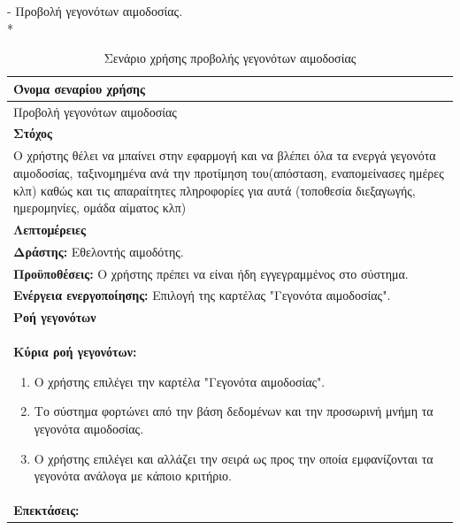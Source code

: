 - Προβολή  γεγονότων αιμοδοσίας.
\\*
\begin{table}[H]	
	\begin{center}
	    \begin{tabular}{|p{\dimexpr \linewidth-2\tabcolsep}|}
	    \hline
	    \rowcolor{grayy}
	    \textbf{Όνομα σεναρίου χρήσης}
	    \\ \hline    
	    Προβολή γεγονότων αιμοδοσίας
	     \\ \hline
	    \rowcolor{grayy}
	    \textbf{\textbf{Στόχος}}
	    \\ \hline
	    	Ο χρήστης θέλει να μπαίνει στην εφαρμογή και να βλέπει όλα τα ενεργά γεγονότα αιμοδοσίας, ταξινομημένα ανά την προτίμηση του(απόσταση, εναπομείνασες ημέρες κλπ) καθώς και τις απαραίτητες πληροφορίες για αυτά (τοποθεσία διεξαγωγής, ημερομηνίες, ομάδα αίματος κλπ)
	    \\ \hline
	    \rowcolor{grayy}
	    \textbf{Λεπτομέρειες}
	    \\ \hline
		\textbf{Δράστης:} Εθελοντής αιμοδότης.
		\\*
		\textbf{Προϋποθέσεις:} Ο χρήστης πρέπει να είναι ήδη εγγεγραμμένος στο σύστημα.
		\\*
		\textbf{Ενέργεια ενεργοποίησης:} Επιλογή της καρτέλας "Γεγονότα αιμοδοσίας".
	    \\ \hline
		\rowcolor{grayy}    
	    \textbf{Ροή γεγονότων}
	    \\ \hline
		\textbf{Κύρια ροή γεγονότων:}
		\begin{enumerate}
			\item	Ο χρήστης επιλέγει την καρτέλα "Γεγονότα αιμοδοσίας".
			\item Το σύστημα φορτώνει από την βάση δεδομένων και την προσωρινή μνήμη τα γεγονότα αιμοδοσίας.
			\item Ο χρήστης επιλέγει και αλλάζει την σειρά ως προς την οποία εμφανίζονται τα γεγονότα ανάλογα με κάποιο κριτήριο.
		\end{enumerate}
				\\ \hline
		\textbf{Επεκτάσεις:}
		   \\ \hline
	    \end{tabular}
	    \caption{Σενάριο χρήσης προβολής γεγονότων αιμοδοσίας}
	    \label{tab:blood_donation_events_show} 
	\end{center}
\end{table}


